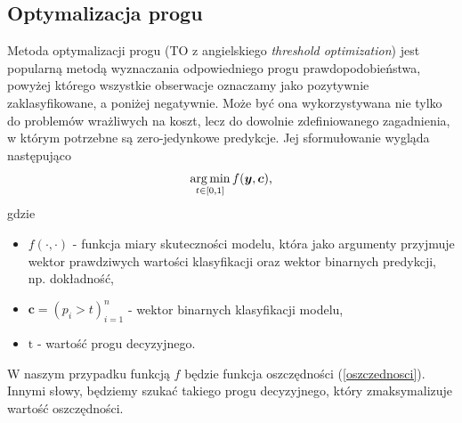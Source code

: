 \documentclass[inzynierska]{pwr_wmat_praca_dyplomowa}
\theoremstyle{plain}
\numberwithin{theorem}{chapter}
\theoremstyle{definition}
\numberwithin{theorem}{chapter}
\DeclareMathOperator*{\argmin}{arg\,min}
\begin{document}
\subsection{Optymalizacja progu}
Metoda optymalizacji progu (TO z angielskiego \textit{threshold optimization}) jest popularną metodą wyznaczania odpowiedniego progu prawdopodobieństwa, powyżej którego wszystkie obserwacje oznaczamy jako pozytywnie zaklasyfikowane, a poniżej negatywnie. Może być ona wykorzystywana nie tylko do problemów wrażliwych na koszt, lecz do dowolnie zdefiniowanego zagadnienia, w którym potrzebne są zero-jedynkowe predykcje. Jej sformułowanie wygląda następująco
$$ \argmin_{t \in [0,1]} f(\ytrue, \boldsymbol{c}) \text{,} $$
gdzie 
\begin{itemize}
	\item $f(\cdot, \cdot) $ - funkcja miary skuteczności modelu, która jako argumenty przyjmuje wektor prawdziwych wartości klasyfikacji oraz wektor binarnych predykcji, np. dokładność,
	\item $\boldsymbol{c} = (p_i > t)_{i=1}^n $ - wektor binarnych klasyfikacji modelu,
	\item $ \text{t} $ - wartość progu decyzyjnego.
\end{itemize}{}
W naszym przypadku funkcją $f$ będzie funkcja oszczędności (\ref{oszczednosci}). Innymi słowy, będziemy szukać takiego progu decyzyjnego, który zmaksymalizuje wartość oszczędności.
\end{document}
